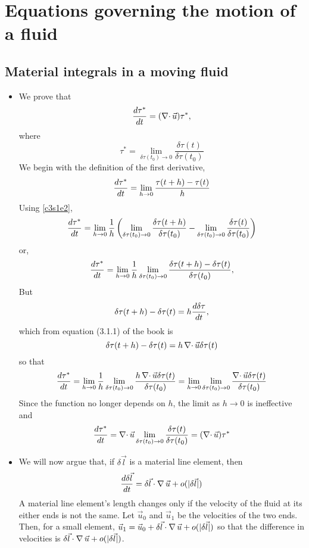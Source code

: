 \chapter{Equations governing the motion of a fluid}\label{c3}
\section{Material integrals in a moving fluid}\label{c3s1}
\begin{itemize}
\item We prove that
\begin{equation}\label{c3s1e1}
\frac{d{\tau^\ast}}{d{t}} = (\operatorname{\nabla\cdot}\vec{u})\tau^\ast,
\end{equation}
where
\begin{equation}\label{c3s1e2}
\tau^\ast = \lim_{\delta\tau(t_0) \rightarrow 0}\frac{\delta\tau(t)}{\delta\tau(t_0)}
\end{equation}
We begin with the definition of the first derivative,
\[
\frac{d{\tau^\ast}}{d{t}} = \lim_{h \rightarrow 0}\frac{\tau(t + h) - \tau(t)}{h}
\]
Using \eqref{c3s1e2},
\[
\frac{d{\tau^\ast}}{d{t}} = \lim_{h \rightarrow 0}\frac{1}{h}\left(\lim_{\delta\tau(t_0) \rightarrow 0}\frac{\delta\tau(t+h)}{\delta\tau(t_0)} - 
\lim_{\delta\tau(t_0) \rightarrow 0}\frac{\delta\tau(t)}{\delta\tau(t_0)}\right)
\]
or,
\[
\frac{d{\tau^\ast}}{d{t}} = \lim_{h \rightarrow 0}\frac{1}{h}\lim_{\delta\tau(t_0) \rightarrow 0}\frac{\delta\tau(t+h) - \delta\tau(t)}{\delta\tau(t_0)},
\]
But
\[
\delta\tau(t+h) - \delta\tau(t) = h\frac{d{\delta\tau}}{d{t}},
\]
which from equation (3.1.1) of the book is
\[
\delta\tau(t+h) - \delta\tau(t) = h\operatorname{\nabla\cdot}\vec{u}\delta\tau(t)
\]
so that
\[
\frac{d{\tau^\ast}}{d{t}} = \lim_{h \rightarrow 0}\frac{1}{h}\lim_{\delta\tau(t_0) \rightarrow 0}\frac{h\operatorname{\nabla\cdot}\vec{u}\delta\tau(t)}{\delta\tau(t_0)} =
\lim_{h \rightarrow 0}\lim_{\delta\tau(t_0) \rightarrow 0}\frac{\operatorname{\nabla\cdot}\vec{u}\delta\tau(t)}{\delta\tau(t_0)}
\]
Since the function no longer depends on $h$, the limit as $h \rightarrow 0$ is ineffective and
\[
\frac{d{\tau^\ast}}{d{t}} = \operatorname{\nabla\cdot}\vec{u}\lim_{\delta\tau(t_0) \rightarrow 0}\frac{\delta\tau(t)}{\delta\tau(t_0)} = (\operatorname{\nabla\cdot}\vec{u})\tau^\ast
\]

\item We will now argue that, if $\delta\vec{l}$ is a material line element, then
\begin{equation}\label{c3s1e3}
\frac{d{\delta\vec{l}}}{d{t}} = \delta\vec{l}\cdot\operatorname{\nabla}\vec{u} + o(|\delta\vec{l}|)
\end{equation}
A material line element's length changes only if the velocity of the fluid at its either ends is not the same. Let $\vec{u}_0$ and $\vec{u}_1$ be the velocities of the two ends. Then, for
a small element, $\vec{u}_1 = \vec{u}_0 + \delta\vec{l}\cdot\operatorname{\nabla}\vec{u} + o(|\delta\vec{l}|)$ so that the difference in velocities is $\delta\vec{l}\cdot\operatorname{\nabla}\vec{u} + 
o(|\delta\vec{l}|)$.


\end{itemize}
